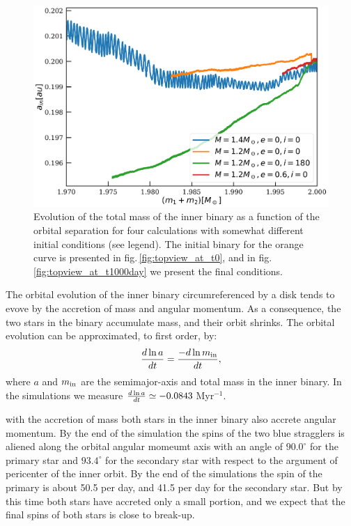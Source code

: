 \documentclass{aastex62}
\begin{document}
\begin{figure}[ht!]
  \includegraphics[width=\columnwidth]{fig_mass_vs_semimajor_axis.pdf}
  \caption{Evolution of the total mass of the inner binary as a
    function of the orbital separation for four calculations with
    somewhat different initial conditions (see legend).  The initial
    binary for the orange curve is presented in
    fig.\,\ref{fig:topview_at_t0}, and in
    fig.\,\ref{fig:topview_at_t1000day} we present the final
    conditions.
\label{fig:mass_vs_semimajor_axis}}
\end{figure}

The orbital evolution of the inner binary circumreferenced by a disk
tends to evove by the accretion of mass and angular momentum. As a
consequence, the two stars in the binary accumulate mass, and their
orbit shrinks. The orbital evolution can be approximated, to first order, by:
\begin{equation}
  {d\ln a \over dt}   = {-d\ln m_{\rm in} \over dt},
\end{equation}
where $a$ and $m_{\rm in}$ are the semimajor-axis and total mass in
the inner binary.  In the simulations we measure ${d\ln a \over dt}
\simeq -0.0843$\,Myr$^{-1}$.

with the accretion of mass both stars in the inner binary also accrete
angular momentum.  By the end of the simulation the spins of the two
blue stragglers is aliened along the orbital angular momeumt axis with
an angle of $90.0^\circ$ for the primary star and $93.4^\circ$ for the
secondary star with respect to the argument of pericenter of the inner
orbit.  By the end of the simulations the spin of the primary is about
50.5 per day, and 41.5 per day for the secondary star. But by this
time both stars have accreted only a small portion, and we expect that
the final spins of both stars is close to break-up.
\end{document}
